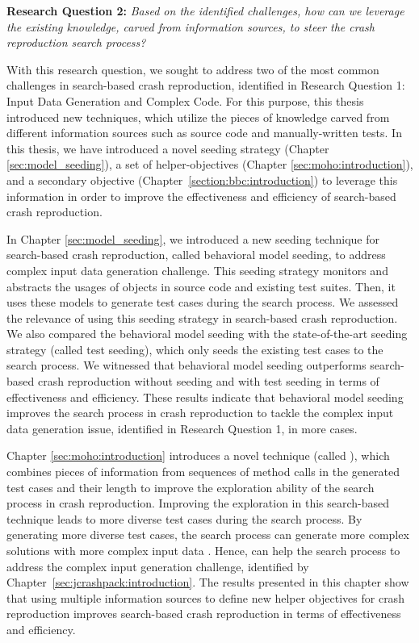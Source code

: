 \textbf{Research Question 2: }\textit{Based on the identified challenges, how can we leverage the existing knowl\-edge, carved from information sources, to steer the crash reproduction search process?}


With this research question, we sought to address two of the most common challenges in search-based crash reproduction, identified in Research Question 1: Input Data Generation and Complex Code. For this purpose, this thesis introduced new techniques, which utilize the pieces of knowledge carved from different information sources such as source code and manually-written tests. In this thesis, we have introduced a novel seeding strategy (Chapter \ref{sec:model_seeding}), a set of helper-objectives (Chapter \ref{sec:moho:introduction}), and a secondary objective (Chapter~\ref{section:bbc:introduction}) to leverage this information in order to improve the effectiveness and efficiency of search-based crash reproduction.

In Chapter \ref{sec:model_seeding}, we introduced a new seeding technique for search-based crash reproduction, called behavioral model seeding, to address complex input data generation challenge. This seeding strategy monitors and abstracts the usages of objects in source code and existing test suites. Then, it uses these models to generate test cases during the search process.
We assessed the relevance of using this seeding strategy in search-based crash reproduction. We also compared the behavioral model seeding with the state-of-the-art seeding strategy (called test seeding), which only seeds the existing test cases to the search process. We witnessed that behavioral model seeding outperforms search-based crash reproduction without seeding and with test seeding in terms of effectiveness and efficiency. These results indicate that behavioral model seeding improves the search process in crash reproduction to tackle the complex input data generation issue, identified in Research Question 1, in more cases.

Chapter \ref{sec:moho:introduction} introduces a novel technique (called \moho), which combines pieces of information from sequences of method calls in the generated test cases and their length to improve the exploration ability of the search process in crash reproduction. Improving the exploration in this search-based technique leads to more diverse test cases during the search process. By generating more diverse test cases, the search process can generate more complex solutions with more complex input data \cite{jensen2004helper}. Hence, \moho can help the search process to address the complex input generation challenge, identified by Chapter~\ref{sec:jcrashpack:introduction}. The results presented in this chapter show that using multiple information sources to define new helper objectives for crash reproduction improves search-based crash reproduction in terms of effectiveness and efficiency.

